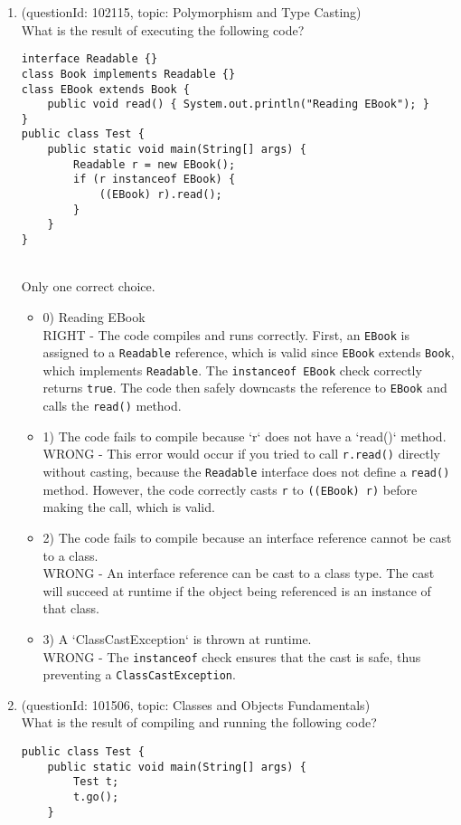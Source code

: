 \documentclass[12pt]{article}
\begin{document}
\begin{enumerate}[label=(\arabic*)]
\begin{itemize}
\end{itemize}
\item (questionId: 102115, topic: Polymorphism and Type Casting) \\ 
What is the result of executing the following code?\n\begin{verbatim}
interface Readable {}
class Book implements Readable {}
class EBook extends Book {
    public void read() { System.out.println("Reading EBook"); }
}
public class Test {
    public static void main(String[] args) {
        Readable r = new EBook();
        if (r instanceof EBook) {
            ((EBook) r).read();
        }
    }
}
\end{verbatim}
\\ \noindent Only one correct choice. 
\begin{itemize}
\item 0) Reading EBook
 \\ 
RIGHT - The code compiles and runs correctly. First, an \verb|EBook| is assigned to a \verb|Readable| reference, which is valid since \verb|EBook| extends \verb|Book|, which implements \verb|Readable|. The \verb|instanceof EBook| check correctly returns \verb|true|. The code then safely downcasts the reference to \verb|EBook| and calls the \verb|read()| method.

\item 1) The code fails to compile because `r` does not have a `read()` method.
 \\ 
WRONG - This error would occur if you tried to call \verb|r.read()| directly without casting, because the \verb|Readable| interface does not define a \verb|read()| method. However, the code correctly casts \verb|r| to \verb|((EBook) r)| before making the call, which is valid.

\item 2) The code fails to compile because an interface reference cannot be cast to a class.
 \\ 
WRONG - An interface reference can be cast to a class type. The cast will succeed at runtime if the object being referenced is an instance of that class.

\item 3) A `ClassCastException` is thrown at runtime.
 \\ 
WRONG - The \verb|instanceof| check ensures that the cast is safe, thus preventing a \verb|ClassCastException|.

\end{itemize}
\item (questionId: 101506, topic: Classes and Objects Fundamentals) \\ 
What is the result of compiling and running the following code?\n\begin{verbatim}
public class Test {
    public static void main(String[] args) {
        Test t;
        t.go();
    }


\end{verbatim}
\end{enumerate}
\end{document}
